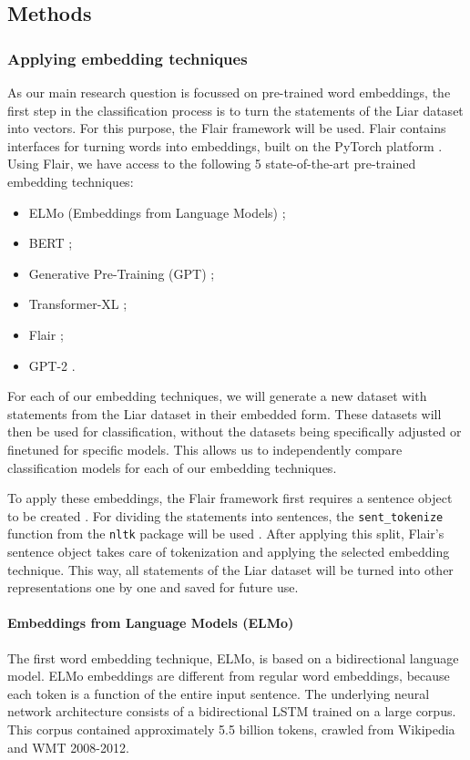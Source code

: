 \subsection{Methods}

\subsubsection{Applying embedding techniques}
As our main research question is focussed on pre-trained word embeddings, the first step in the classification process is to turn the statements of the Liar dataset into vectors. 
For this purpose, the Flair framework will be used. 
Flair contains interfaces for turning words into embeddings, built on the PyTorch platform \cite{flairrepo,pytorch}. 
Using Flair, we have access to the following 5 state-of-the-art pre-trained embedding techniques: 
\begin{itemize}
    \item ELMo (Embeddings from Language Models) \cite{peters2018};
    \item BERT \cite{devlin2018};
    \item Generative Pre-Training (GPT) \cite{radford2018};
    \item Transformer-XL \cite{dai2019};
    \item Flair \cite{akbik2019};
    \item GPT-2 \cite{radford2019}.
\end{itemize}

For each of our embedding techniques, we will generate a new dataset with statements from the Liar dataset in their embedded form. 
These datasets will then be used for classification, without the datasets being specifically adjusted or finetuned for specific models.
This allows us to independently compare classification models for each of our embedding techniques. 

To apply these embeddings, the Flair framework first requires a sentence object to be created \cite{flairsentence}.
For dividing the statements into sentences, the \texttt{sent\_tokenize} function from the \texttt{nltk} package will be used \cite{nltktokenize}. 
After applying this split, Flair's sentence object takes care of tokenization and applying the selected embedding technique.
This way, all statements of the Liar dataset will be turned into other representations one by one and saved for future use.

\paragraph{Embeddings from Language Models (ELMo)}
The first word embedding technique, ELMo, is based on a bidirectional language model. 
ELMo embeddings are different from regular word embeddings, because each token is a function of the entire input sentence.
The underlying neural network architecture consists of a bidirectional LSTM trained on a large corpus.
This corpus contained approximately 5.5 billion tokens, crawled from Wikipedia and WMT 2008-2012.

